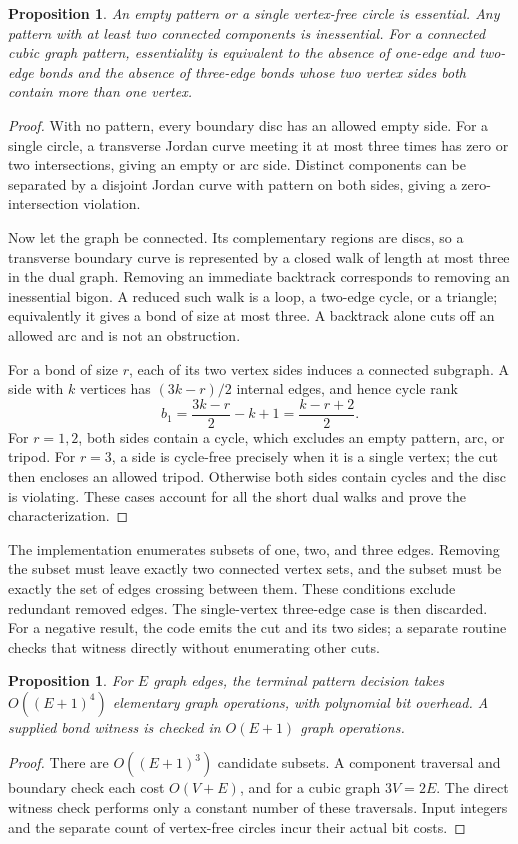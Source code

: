 \documentclass[11pt]{article}
\newtheorem{proposition}[theorem]{Proposition}
\theoremstyle{definition}\newtheorem{definition}[theorem]{Definition}
\begin{document}
\begin{proposition}\label{prop:patterns}
An empty pattern or a single vertex-free circle is essential. Any pattern
with at least two connected components is inessential. For a connected cubic
graph pattern, essentiality is equivalent to the absence of one-edge and
two-edge bonds and the absence of three-edge bonds whose two vertex sides
both contain more than one vertex.
\end{proposition}
\begin{proof}
With no pattern, every boundary disc has an allowed empty side. For a single
circle, a transverse Jordan curve meeting it at most three times has zero or
two intersections, giving an empty or arc side. Distinct components can be
separated by a disjoint Jordan curve with pattern on both sides, giving a
zero-intersection violation.

Now let the graph be connected. Its complementary regions are discs, so a
transverse boundary curve is represented by a closed walk of length at most
three in the dual graph. Removing an immediate backtrack corresponds to
removing an inessential bigon. A reduced such walk is a loop, a two-edge
cycle, or a triangle; equivalently it gives a bond of size at most three.
A backtrack alone cuts off an allowed arc and is not an obstruction.

For a bond of size $r$, each of its two vertex sides induces a connected
subgraph. A side with $k$ vertices has $(3k-r)/2$ internal edges, and hence
cycle rank
\[
 b_1=\frac{3k-r}{2}-k+1=\frac{k-r+2}{2}.
\]
For $r=1,2$, both sides contain a cycle, which excludes an empty pattern, arc,
or tripod. For $r=3$, a side is cycle-free precisely when it is a single
vertex; the cut then encloses an allowed tripod. Otherwise both sides contain
cycles and the disc is violating. These cases account for all the short dual
walks and prove the characterization.
\end{proof}

The implementation enumerates subsets of one, two, and three edges. Removing
the subset must leave exactly two connected vertex sets, and the subset must
be exactly the set of edges crossing between them. These conditions exclude
redundant removed edges. The single-vertex three-edge case is then discarded.
For a negative result, the code emits the cut and its two sides; a separate
routine checks that witness directly without enumerating other cuts.

\begin{proposition}
For $E$ graph edges, the terminal pattern decision takes
$O((E+1)^4)$ elementary graph operations, with polynomial bit overhead.
A supplied bond witness is checked in $O(E+1)$ graph operations.
\end{proposition}
\begin{proof}
There are $O((E+1)^3)$ candidate subsets. A component traversal and boundary
check each cost $O(V+E)$, and for a cubic graph $3V=2E$. The direct witness
check performs only a constant number of these traversals. Input integers
and the separate count of vertex-free circles incur their actual bit costs.
\end{proof}
\end{document}
